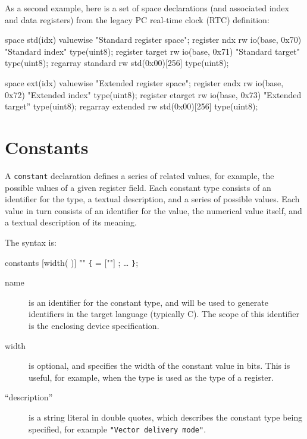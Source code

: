 \documentclass[a4paper,11pt,twoside]{report}
\begin{document}
As a second example, here is a set of space declarations (and
associated index and data registers) from the legacy PC real-time
clock (RTC) definition: 

\begin{example}
space std(idx) valuewise "Standard register space";
register ndx rw io(base, 0x70) "Standard index" 
             type(uint8);
register target rw io(base, 0x71) "Standard target" 
             type(uint8);
regarray standard rw std(0x00)[256] type(uint8);

space ext(idx) valuewise "Extended register space"; 
register endx rw io(base, 0x72) "Extended index" 
             type(uint8);
register etarget rw io(base, 0x73) "Extended target''
             type(uint8);
regarray extended rw std(0x00)[256] type(uint8);
\end{example}

\section{Constants}\label{sec:constants}

A \texttt{constant} declaration defines a series of related values,
for example, the possible values of a given register field.  Each
constant type consists of an identifier for the type, a textual
description, and a series of possible values.   Each value in turn
consists of an identifier for the value, the numerical value itself,
and a textual description of its meaning. 

The syntax is:

\begin{syntax}
constants  [width(  )] "" \verb+{+ 
    =  [""] ;
   \ldots
\verb+}+; 
\end{syntax}


\begin{description}
\item[name] is an identifier for the constant type, and will be used to
  generate identifiers in the target language (typically C).  The
  scope of this identifier is the enclosing device specification.  

\item[width] is optional, and specifies the width of the constant
  value in bits.  This is useful, for example, when the type is used
  as the type of a register. 

\item [``description''] is a string literal in double quotes, which
  describes the constant type being specified, for example
  \texttt{"Vector delivery mode"}. 
\end{description}
\end{document}
